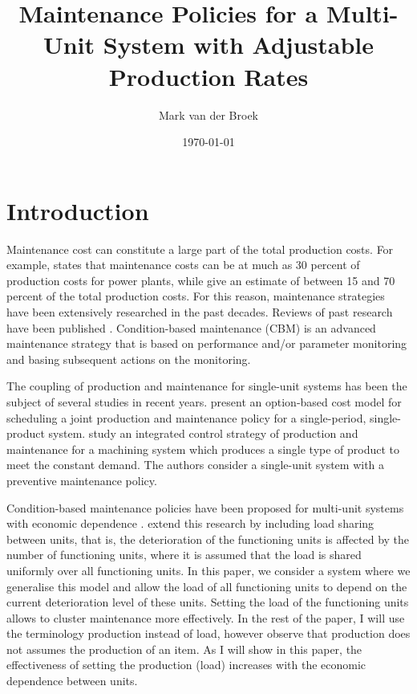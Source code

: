 \documentclass[a4paper,12pt]{article}
\title{Maintenance Policies for a Multi-Unit System with Adjustable Production Rates}
\author{Mark van der Broek}
\date{\today}
\begin{document}
	
	\maketitle

\section{Introduction}	
Maintenance cost can constitute a large part of the total production costs. For example, \cite{GRABER2004861} states that maintenance costs can be at much as 30 percent of production costs for power plants, while \cite{BEVILACQUA200071} give an estimate of between 15 and 70 percent of the total production costs. For this reason, maintenance strategies have been extensively researched in the past decades. Reviews of past research have been published \citep{VANHORENBEEK2013499, OLDEKEIZER2017405}. Condition-based maintenance (CBM) is an advanced maintenance strategy that is based on performance and/or parameter monitoring and basing subsequent actions on the monitoring. 

The coupling of production and maintenance for single-unit systems has been the subject of several studies in recent years. \cite{doi:10.1080/00207543.2013.843037} present an option-based cost model for scheduling a joint production and maintenance policy for a single-period, single-product system. \cite{doi:10.1080/00207543.2016.1174343}  study an integrated control strategy of production and maintenance for a machining system which produces a single type of product to meet the constant demand. The authors consider a single-unit system with a preventive maintenance policy. 

Condition-based maintenance policies have been proposed for multi-unit systems with economic dependence \citep{OLDEKEIZER2016531}. \cite{OLDEKEIZER2018319} extend this research by including load sharing between units, that is, the deterioration of the functioning units is affected by the number of functioning units, where it is assumed that the load is shared uniformly over all functioning units. In this paper, we consider a system where we generalise this model and allow the load of all functioning units to depend on the current deterioration level of these units. Setting the load of the functioning units allows to cluster maintenance more effectively. In the rest of the paper, I will use the terminology production instead of load, however observe that production does not assumes the production of an item. As I will show in this paper, the effectiveness of setting the production (load) increases with the economic dependence between units. 
\end{document}
